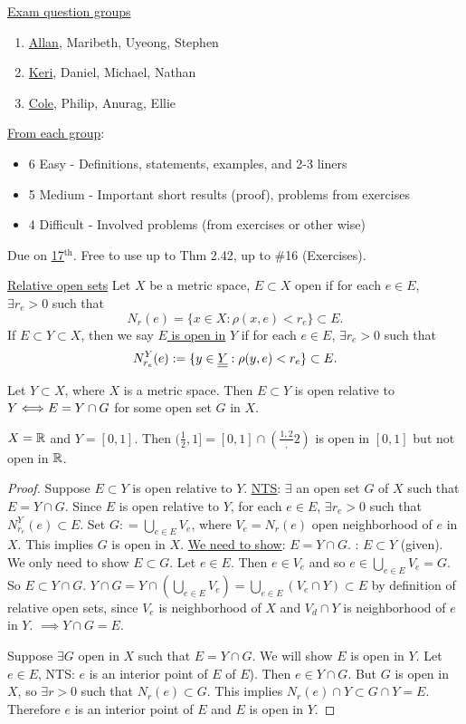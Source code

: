 \documentclass[]{article}
\begin{document}
\ul{Exam question groups}
\begin{enumerate}
	\item \ul{Allan}, Maribeth, Uyeong, Stephen
	\item \ul{Keri}, Daniel, Michael, Nathan
	\item \ul{Cole}, Philip, Anurag, Ellie
\end{enumerate}
\ul{From each group}:
\begin{itemize}
	\item 6 Easy - Definitions, statements, examples, and 2-3 liners
	\item 5 Medium - Important short results (proof), problems from exercises
	\item 4 Difficult - Involved problems (from exercises or other wise)
\end{itemize}
Due on \ul{\ul{17$^\text{th}$}}.
Free to use up to Thm 2.42, up to \#16 (Exercises).

\ul{Relative open sets}
Let $X$ be a metric space, $E\subset X$ open if for each $e\in E$, $\exists r_e>0$ such that $$N_r(e) = \{x\in X:\rho(x,e)<r_e\} \subset E.$$
If $E\subset Y\subset X$, then we say \ul{$E$ is open in} $Y$ if for each $e\in E$, $\exists r_e>0$ such that $$N_{r_e}^Y(e) := \{y\in \underline{\underline{Y}}:\rho(y,e)< r_e\} \subset E.$$

\begin{theorem}
	Let $Y\subset X$, where $X$ is a metric space. Then $E\subset Y$ is open relative to $Y \Longleftrightarrow E = Y\cap G$ for some open set $G$ in $X$.
\end{theorem}
\begin{example}
	$X = \mathbb{R}$ and $Y = [0,1]$. Then $(\frac{1}{2},1] = [0,1]\cap(\frac{1,2},2)$ is open in $[0,1]$ but not open in $\mathbb{R}$.
\end{example}
\begin{proof}
	\say{$\implies$} Suppose $E\subset Y$ is open relative to $Y$.
	\ul{\ul{NTS}}: $\exists$ an open set $G$ of $X$ such that $E = Y\cap G$.
	Since $E$ is open relative to $Y$, for each $e\in E$, $\exists r_e>0$ such that $N_{r_e}^Y(e) \subset E$.
	Set $G: = \bigcup_{e\in E} V_e$, where $V_e = N_r(e)$ open neighborhood of $e$ in $X$.
	This implies $G$ is open in $X$.
	\ul{We need to show}: $E = Y\cap G$.
	\say{$\subset$}: $E\subset Y$ (given). We only need to show $E\subset G$.
	Let $e\in E$. Then $e\in V_e$ and so $e\in \bigcup_{e\in E} V_e = G$.
	So $E\subset Y\cap G$.
	\say{$\supset$} $Y\cap G = Y\cap\left(\bigcup_{e\in E} V_e\right) = \bigcup_{e\in E} (V_e \cap Y) \subset E$ by definition of relative open sets, since $V_e$ is neighborhood of $X$ and $V_d\cap Y$ is neighborhood of $e$ in $Y$.
	$\implies Y\cap G = E$.

	\say{$\Lla$} Suppose $\exists G$ open in $X$ such that $E = Y\cap G$. We will show $E$ is open in $Y$.
	Let $e\in E$, NTS: $e$ is an interior point of $E$ of $E$).
	Then $e\in Y\cap G$. But $G$ is open in $X$, so $\exists r>0$ such that $N_r(e) \subset G$.
	This implies $N_r(e)\cap Y\subset G\cap Y = E$.
	Therefore $e$ is an interior point of $E$ and $E$ is open in $Y$.
\end{proof}
\end{document}
